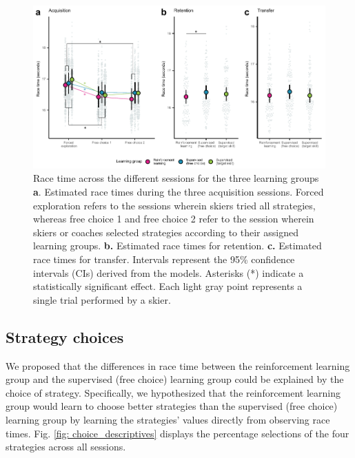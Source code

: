 \documentclass[pdflatex,sn-nature]{sn-jnl}%
\theoremstyle{thmstyleone}%
\theoremstyle{thmstyletwo}%
\theoremstyle{thmstylethree}%
\begin{document}
\begin{figure}[H]
\centering
\includegraphics{figures/figure_racingtimes_2.pdf}
\caption{Race time across the different sessions for the three learning groups \textbf{a}. Estimated race times during the three acquisition sessions. Forced exploration refers to the sessions wherein skiers tried all strategies, whereas free choice 1 and free choice 2 refer to the session wherein skiers or coaches selected strategies according to their assigned learning groups. \textbf{b.} Estimated race times for retention. \textbf{c.} Estimated race times for transfer. Intervals represent the 95\% confidence intervals (CIs) derived from the models. Asterisks (*) indicate a statistically significant effect. Each light gray point represents a single trial performed by a skier.}
\label{fig: racetime}
\end{figure}


\subsection{Strategy choices}\label{result_strategychoice}
We proposed that the differences in race time between the reinforcement learning group and the supervised (free choice) learning group could be explained by the choice of strategy. Specifically, we hypothesized that the reinforcement learning group would learn to choose better strategies than the supervised (free choice) learning group by learning the strategies' values directly from observing race times. Fig. \ref{fig: choice_descriptives} displays the percentage selections of the four strategies across all sessions.
\end{document}
